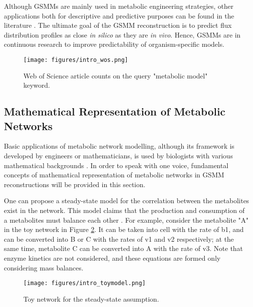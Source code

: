 Although GSMMs are mainly used in metabolic engineering strategies, other applications both for descriptive and predictive purposes can be found in the literature \cite{osterlund2012fifteen}. The ultimate goal of the GSMM reconstruction is to predict flux distribution profiles as close \emph{in silico} as they are \emph{in vivo}. Hence, GSMMs are in continuous research to improve predictability of organism-specific models.

\vspace{0.8cm}
\begin{figure}[H]
\begin{center}
\texttt{[image: figures/intro\_wos.png]}
\end{center}
\caption[Web of Science article counts on the query "metabolic model" keyword]{Web of Science article counts on the query "metabolic model" keyword.}
\label{fig:wos_metabolicmodel}
\end{figure}

\subsection{Mathematical Representation of Metabolic Networks}
Basic applications of metabolic network modelling, although its framework is developed by engineers or mathematicians, is used by biologists with various mathematical backgrounds \cite{pinzon2018mathematical}. In order to speak with one voice, fundamental concepts of mathematical representation of metabolic networks in GSMM reconstructions will be provided in this section.

One can propose a steady-state model for the correlation between the metabolites exist in the network. This model claims that the production and consumption of a metabolites must balance each other \cite{reimers2016steady}. For example, consider the metabolite "A" in the toy network in Figure \ref{fig:ToyNetwork}. It can be taken into cell with the rate of b1, and can be converted into B or C with the rates of v1 and v2 respectively; at the same time, metabolite C can be converted into A with the rate of v3. Note that enzyme kinetics are not considered, and these equations are formed only considering mass balances.

\begin{figure}[H]
\begin{center}
\texttt{[image: figures/intro\_toymodel.png]}
\end{center}
\caption[Toy network for the steady-state assumption]{Toy network for the steady-state assumption.}
\label{fig:ToyNetwork}
\end{figure}
\vspace{-0.5cm}


